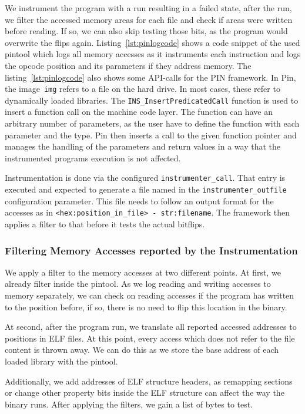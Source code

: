 We instrument the program with a run resulting in a failed state, after the run,
we filter the accessed memory areas for each file and check if areas were
written before reading. If so, we can also skip testing those bits, as the
program would overwrite the flips again. Listing~\ref{lst:pinlogcode} shows a
code snippet of the used pintool which logs all memory accesses as it
instruments each instruction and logs the opcode position and its parameters if
they address memory. The listing~\ref{lst:pinlogcode} also shows some API-calls
for the PIN framework. In Pin, the image~\texttt{img} refers to a file on the
hard drive. In most cases, these refer to dynamically loaded libraries. The
\texttt{INS\_InsertPredicatedCall} function is used to insert a function call on
the machine code layer. The function can have an arbitrary number of parameters,
as the user have to define the function with each parameter and the type. Pin
then inserts a call to the given function pointer and manages the handling of
the parameters and return values in a way that the instrumented
program\textquotesingle s execution is not affected.

Instrumentation is done via the configured \texttt{instrumenter\_call}. That
entry is executed and expected to generate a file named in the
\texttt{instrumenter\_outfile} configuration parameter. This file needs to
follow an output format for the accesses as in \texttt{<hex:position\_in\_file>
- str:filename}. The framework then applies a filter to that before it tests the
actual bitflips.

\subsubsection{Filtering Memory Accesses reported by the Instrumentation}

We apply a filter to the memory accesses at two different points. At first, we
already filter inside the pintool. As we log reading and writing accesses to
memory separately, we can check on reading accesses if the program
has written to the position before, if so, there is no need to flip this
location in the binary.

At second, after the program run, we translate all reported accessed addresses
to positions in ELF files. At this point, every access which does not refer to
the file content is thrown away. We can do this as we store the base address of
each loaded library with the pintool.

Additionally, we add addresses of ELF structure headers, as remapping sections
or change other property bits inside the ELF structure can affect the way the
binary runs. After applying the filters, we gain a list of bytes to test.

